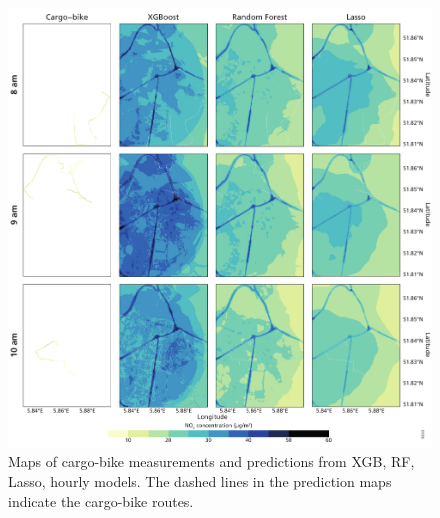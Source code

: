 \documentclass{article}
\begin{document}
\begin{figure}[H]
    \includegraphics[width=\linewidth]{maps.pdf}
    
    \caption {Maps of cargo-bike measurements and predictions from XGB,  RF,  Lasso, hourly models. The dashed lines in the prediction maps indicate the cargo-bike routes.}
    \label{maps}
\end{figure}
\end{document}

